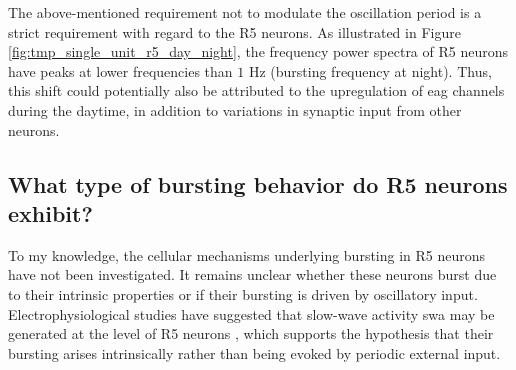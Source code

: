 \documentclass[../main.tex]{subfiles}
\begin{document}
The above-mentioned requirement not to modulate the oscillation period is a strict requirement with regard to the R5 neurons. As illustrated in Figure \ref{fig:tmp_single_unit_r5_day_night}, the frequency power spectra of R5 neurons have peaks at lower frequencies than $1$ Hz (bursting frequency at night). Thus, this shift could potentially also be attributed to the upregulation of \gls{eag} channels during the daytime, in addition to variations in synaptic input from other neurons.





\subsection{What type of bursting behavior do R5 neurons exhibit?}

To my knowledge, the cellular mechanisms underlying bursting in R5 neurons have not been investigated. It remains unclear whether these neurons burst due to their intrinsic properties or if their bursting is driven by oscillatory input. Electrophysiological studies have suggested that slow-wave activity \gls{swa} may be generated at the level of R5 neurons \parencite{raccugliaNetworkSpecificSynchronizationElectrical2019}, which supports the hypothesis that their bursting arises intrinsically rather than being evoked by periodic external input.
\end{document}
